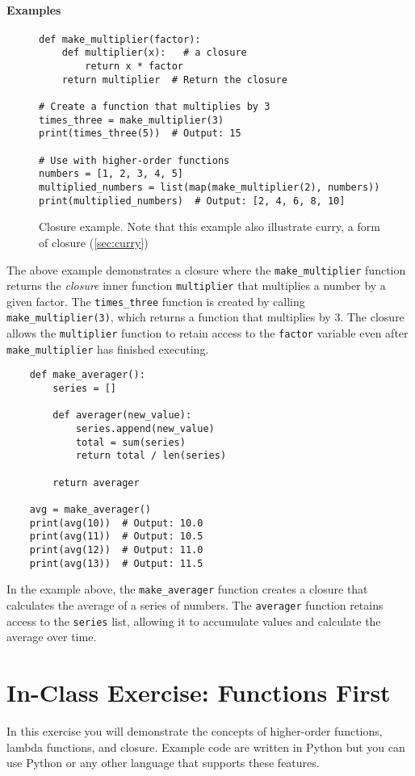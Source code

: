 \documentclass[oneside,11pt,dvipsnames]{book}
\newcommand{\code}[1]{\texttt{#1}}
\begin{document}
\paragraph{Examples}
\begin{figure}
\begin{lstlisting}
def make_multiplier(factor):
    def multiplier(x):   # a closure
        return x * factor
    return multiplier  # Return the closure

# Create a function that multiplies by 3
times_three = make_multiplier(3)
print(times_three(5))  # Output: 15

# Use with higher-order functions
numbers = [1, 2, 3, 4, 5]
multiplied_numbers = list(map(make_multiplier(2), numbers))
print(multiplied_numbers)  # Output: [2, 4, 6, 8, 10]
\end{lstlisting}
\caption{Closure example. Note that this example also illustrate curry, a form of closure (\autoref{sec:curry})}\label{ex:closure-example}
\end{figure}

The above example demonstrates a closure where the \code{make\_multiplier} function returns the \emph{closure} inner function \code{multiplier} that multiplies a number by a given factor. The \code{times\_three} function is created by calling \code{make\_multiplier(3)}, which returns a function that multiplies by 3. The closure allows the \code{multiplier} function to retain access to the \code{factor} variable even after \code{make\_multiplier} has finished executing.

\begin{lstlisting}
    def make_averager():
        series = []

        def averager(new_value):
            series.append(new_value)
            total = sum(series)
            return total / len(series)

        return averager

    avg = make_averager()
    print(avg(10))  # Output: 10.0
    print(avg(11))  # Output: 10.5
    print(avg(12))  # Output: 11.0
    print(avg(13))  # Output: 11.5
\end{lstlisting}

In the example above, the \code{make\_averager} function creates a closure that calculates the average of a series of numbers. The \code{averager} function retains access to the \code{series} list, allowing it to accumulate values and calculate the average over time.
\section{In-Class Exercise: Functions First}
In this exercise you will demonstrate the concepts of higher-order functions, lambda functions, and closure. Example code are written in Python but you can use Python or any other language that supports these features.
\end{document}
